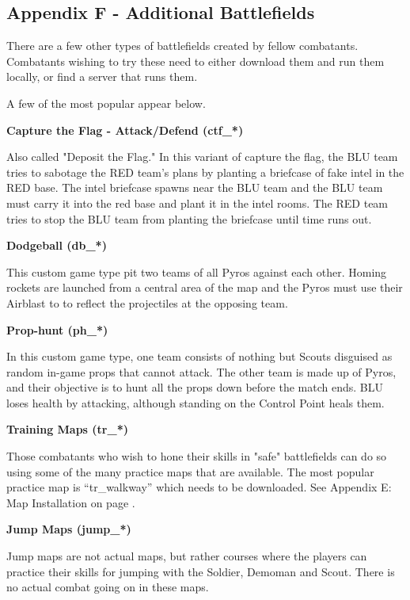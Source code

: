 \subsection{Appendix F - Additional Battlefields}
\label{Additional_Battlefields}
There are a few other types of battlefields created by fellow combatants.  Combatants wishing to try these need to either download them and run them locally, or find a server that runs them.

A few of the most popular appear below.

{\bf Capture the Flag - Attack/Defend (ctf\_*)}

Also called "Deposit the Flag." In this variant of capture the flag, the BLU team tries to sabotage the RED team's plans by planting a briefcase of fake intel in the RED base. The intel briefcase spawns near the BLU team and the BLU team must carry it into the red base and plant it in the intel rooms. The RED team tries to stop the BLU team from planting the briefcase until time runs out.

{\bf Dodgeball (db\_*)}

This custom game type pit two teams of all Pyros against each other. Homing rockets are launched from a central area of the map and the Pyros must use their Airblast to to reflect the projectiles at the opposing team.

{\bf Prop-hunt (ph\_*)}

In this custom game type, one team consists of nothing but Scouts disguised as random in-game props that cannot attack. The other team is made up of Pyros, and their objective is to hunt all the props down before the match ends. BLU loses health by attacking, although standing on the Control Point heals them.

{\bf Training Maps (tr\_*)}

Those combatants who wish to hone their skills in "safe" battlefields can do so using some of the many practice maps that are available.  The most popular practice map is “tr\_walkway” which needs to be downloaded.  See Appendix E: Map Installation on page \pageref{map_install}.

{\bf Jump Maps (jump\_*)}

Jump maps are not actual maps, but rather courses where the players can practice their skills for jumping with the Soldier, Demoman and Scout. There is no actual combat going on in these maps.